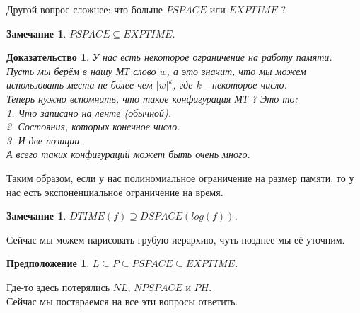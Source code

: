 \documentclass{beamer}
\theoremstyle{plain}
\newtheorem{conj}[thm]{Предположение}
\newtheorem{rmk}[thm]{Замечание}
\newtheorem{proof-rus}[thm]{Доказательство}
\theoremstyle{definition}
\begin{document}
\begin{frame}
    Другой вопрос сложнее: что больше $PSPACE$ или $EXPTIME$ ?
    \begin{rmk}
         $PSPACE \subseteq EXPTIME$.
    \end{rmk}
    \begin{proof-rus}
        У нас есть некоторое ограничение на работу памяти. \\
        Пусть мы берём в нашу МТ слово $w$, а это значит, что мы можем использовать места не более чем $|w|^k$, где $k$ - некоторое число. \\
        Теперь нужно вспомнить, что такое конфигурация МТ ?
        Это то: \\
        1. Что записано на ленте (обычной). \\
        2. Состояния, которых конечное число. \\
        3. И две позиции. \\
        А всего таких конфигураций может быть очень много.
    \end{proof-rus}
\end{frame}

\begin{frame}
    Таким образом, если у нас полиномиальное ограничение на размер памяти, то у нас
    есть экспоненциальное ограничение на время.
    \begin{rmk}
        $DTIME(f) \supseteq DSPACE(log(f))$.
    \end{rmk}
    Сейчас мы можем нарисовать грубую иерархию, чуть позднее мы её уточним.
    \begin{conj}
        $L \subseteq P \subseteq PSPACE \subseteq EXPTIME$.
    \end{conj}
    Где-то здесь потерялись $NL$, $NPSPACE$ и $PH$. \\
    Сейчас мы постараемся на все эти вопросы ответить.
\end{frame}
\end{document}
